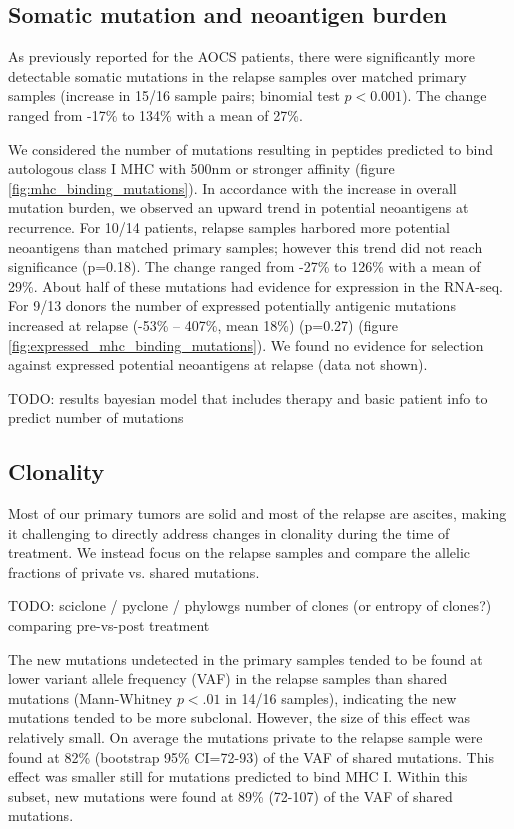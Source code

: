 \subsection*{Somatic mutation and neoantigen burden}

As previously reported for the AOCS patients, there were significantly more detectable somatic mutations in the relapse samples over matched primary samples (increase in 15/16 sample pairs; binomial test $p \lt 0.001$). The change ranged from -17\% to 134\% with a mean of 27\%.

We considered the number of mutations resulting in peptides predicted to bind autologous class I MHC with 500nm or stronger affinity (figure \ref{fig:mhc_binding_mutations}). In accordance with the increase in overall mutation burden, we observed an upward trend in potential neoantigens at recurrence. For 10/14 patients, relapse samples harbored more potential neoantigens than matched primary samples; however this trend did not reach significance (p=0.18). The change ranged from -27\% to 126\% with a mean of 29\%. About half of these mutations had evidence for expression in the RNA-seq. For 9/13 donors the number of expressed potentially antigenic mutations increased at relapse (-53\% -- 407\%, mean 18\%) (p=0.27) (figure \ref{fig:expressed_mhc_binding_mutations}). We found no evidence for selection against expressed potential neoantigens at relapse (data not shown).

TODO: results bayesian model that includes therapy and basic patient info to predict number of mutations


\subsection*{Clonality}
Most of our primary tumors are solid and most of the relapse are ascites, making it challenging to directly address changes in clonality during the time of treatment. We instead focus on the relapse samples and compare the allelic fractions of private vs. shared mutations.

TODO: sciclone / pyclone / phylowgs number of clones (or entropy of clones?) comparing pre-vs-post treatment

The new mutations undetected in the primary samples tended to be found at lower variant allele frequency (VAF) in the relapse samples than shared mutations (Mann-Whitney $p \lt .01$ in 14/16 samples), indicating the new mutations tended to be more subclonal. However, the size of this effect was relatively small. On average the mutations private to the relapse sample were found at 82\% (bootstrap 95\% CI=72-93) of the VAF of shared mutations. This effect was smaller still for mutations predicted to bind MHC I. Within this subset, new mutations were found at 89\% (72-107) of the VAF of shared mutations.

